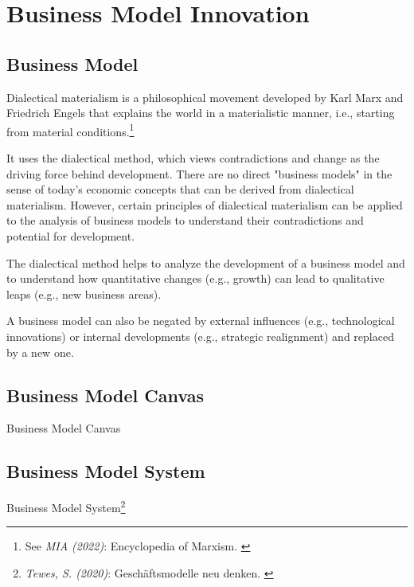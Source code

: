 %
%

\pagebreak
\section{Business Model Innovation}

\onehalfspacing

\subsection{Business Model}

Dialectical materialism is a philosophical movement developed by Karl Marx and Friedrich Engels that explains the world in a materialistic manner, i.e., starting from material conditions.\footnote{See \textit{MIA (2022)}: Encyclopedia of Marxism. \cite{diaMat}}

It uses the dialectical method, which views contradictions and change as the driving force behind development. There are no direct "business models" in the sense of today's economic concepts that can be derived from dialectical materialism. However, certain principles of dialectical materialism can be applied to the analysis of business models to understand their contradictions and potential for development.

The dialectical method helps to analyze the development of a business model and to understand how quantitative changes (e.g., growth) can lead to qualitative leaps (e.g., new business areas).

A business model can also be negated by external influences (e.g., technological innovations) or internal developments (e.g., strategic realignment) and replaced by a new one.

\subsection{Business Model Canvas}

Business Model Canvas

\subsection{Business Model System}

Business Model System\footnote{\textit{Tewes, S. (2020)}: Geschäftsmodelle neu denken. \cite{zukunft}} 

